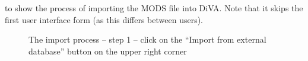  to  show the process of importing the MODS file into DiVA. Note that it skips the first user interface form (as this differs between users).

\begin{figure}[!ht]
  \begin{center}
  \end{center}
  \caption[The import process – step 1]{The import process – step 1 – click on the “Import from external database” button on the upper right corner}
  \label{fig:divaImport1}
\end{figure}
\FloatBarrier

